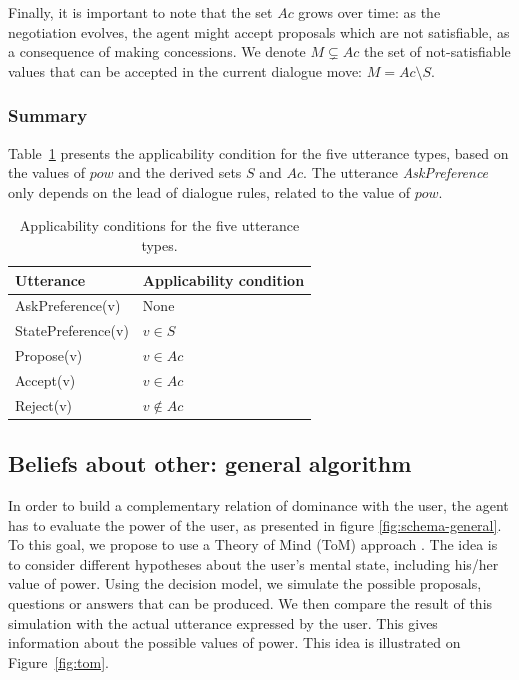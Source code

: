 \documentclass[sigconf]{aamas}  %
\begin{document}
	Finally, it is important to note that the set $Ac$ grows over time: as the negotiation evolves, the agent might accept proposals which are not satisfiable, as a consequence of making concessions. We denote $M\varsubsetneq Ac$ the set of not-satisfiable values that can be accepted in the current dialogue move: $M = Ac\setminus S$.
	
	\subsubsection{Summary}	
	Table~\ref{tab:utt} presents the applicability condition for the five utterance types, based on the values of $pow$ and the derived sets $S$ and $Ac$. The utterance \emph{AskPreference} only depends on the lead of dialogue rules, related to the value of $pow$.
	
	\begin{table}
		\centering
		\caption{Applicability conditions for the five utterance types.}
		\label{tab:utt}
		\begin{tabular}  {|l|l|}
			\hline
			Utterance & Applicability condition \\
			\hline
			AskPreference(v) & None \\
			\hline 
			StatePreference(v) & $v\in S$ \\
			\hline 
			Propose(v) & $v\in Ac$ \\
			\hline
			Accept(v)  & $v\in Ac$ \\
			\hline
			Reject(v) & $v\notin Ac$ \\
			\hline
		\end{tabular}
	\end{table}
	
	\subsection{Beliefs about other: general algorithm}
	
	In order to build a complementary relation of dominance with the user, the agent has to evaluate the power of the user, as presented in figure \ref{fig:schema-general}. To this goal, we propose to use a Theory of Mind (ToM) approach \cite{premack1978does}. The idea is to consider different hypotheses about the user's mental state, including his/her value of power. Using the decision model, we simulate the possible proposals, questions or answers that can be produced. We then compare the result of this simulation with the actual utterance expressed by the user. This gives information about the possible values of power. This idea is illustrated on Figure~\ref{fig:tom}.
	
\end{document}
